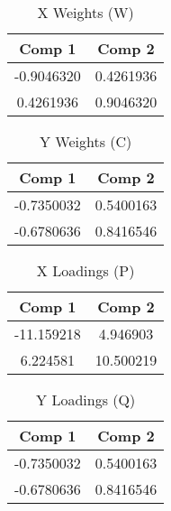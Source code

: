 \documentclass{article}
\begin{document}
\pagestyle{empty}

\begin{minipage}[t]{0.48\linewidth}
\begin{table}[H]
\centering
\caption{\label{tab:unnamed-chunk-8}X Weights (W)}
\centering
\begin{tabular}[t]{|>{}c>{}c|}
\toprule
Comp 1 & Comp 2\\
\midrule
-0.9046320 & 0.4261936\\
0.4261936 & 0.9046320\\
\bottomrule
\end{tabular}
\end{table}
\end{minipage}\begin{minipage}[t]{0.48\linewidth}
\begin{table}[H]
\centering
\caption{\label{tab:unnamed-chunk-8}Y Weights (C)}
\centering
\begin{tabular}[t]{|>{}c>{}c|}
\toprule
Comp 1 & Comp 2\\
\midrule
-0.7350032 & 0.5400163\\
-0.6780636 & 0.8416546\\
\bottomrule
\end{tabular}
\end{table}
\end{minipage}

\begin{minipage}[t]{0.48\linewidth}
\begin{table}[H]
\centering
\caption{\label{tab:unnamed-chunk-8}X Loadings (P)}
\centering
\begin{tabular}[t]{|>{}c>{}c|}
\toprule
Comp 1 & Comp 2\\
\midrule
-11.159218 & 4.946903\\
6.224581 & 10.500219\\
\bottomrule
\end{tabular}
\end{table}
\end{minipage}\begin{minipage}[t]{0.48\linewidth}
\begin{table}[H]
\centering
\caption{\label{tab:unnamed-chunk-8}Y Loadings (Q)}
\centering
\begin{tabular}[t]{|>{}c>{}c|}
\toprule
Comp 1 & Comp 2\\
\midrule
-0.7350032 & 0.5400163\\
-0.6780636 & 0.8416546\\
\bottomrule
\end{tabular}
\end{table}
\end{minipage}
\end{document}
